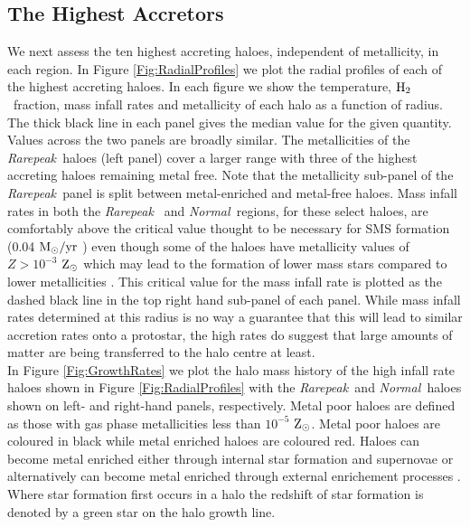\documentclass[graphics, twocolumn, usenatbib]{mn2e}
\newcommand{\msolaryr} {$\rm{M_{\odot}/yr}~$}
\newcommand{\zsolar} {$\rm{Z_{\odot}}~$}
\newcommand{\zsolarc} {$\rm{Z_{\odot}}$}
\newcommand{\molH} {$\rm{H_2}$~}
\newcommand{\rarepeak} {\textit{Rarepeak~}}
\newcommand{\normal} {\textit{Normal~}}
\begin{document}
\subsection{The Highest Accretors}
\indent We next assess the ten highest accreting haloes, independent of metallicity, in each region. In Figure
\ref{Fig:RadialProfiles} we plot the radial profiles of each of the highest accreting haloes.
In each figure we show the temperature, \molH fraction, mass infall rates and
metallicity of each halo as a function of radius. The thick black line in each panel gives the
median value for the given quantity. Values across the two panels are broadly similar. The
metallicities of the \rarepeak haloes (left panel) cover a larger range with three of the highest
accreting haloes remaining metal free. Note that the metallicity sub-panel of the \rarepeak panel
is split between metal-enriched and metal-free haloes. Mass infall rates in both the \rarepeak
and \normal regions, for these select haloes, are comfortably above the critical value thought to
be necessary for SMS formation (0.04
\msolaryr \citep{Sakurai_2016}) even though some of the haloes have metallicity values of $Z > 10^{-3}$
\zsolar which may lead to the formation of lower mass stars compared to lower metallicities
\citep{Chon_2020}. This critical value for the mass infall rate is plotted as the dashed black line in
the top right hand sub-panel of each panel. While mass infall rates determined at this radius is no
way a guarantee that this will lead to similar accretion rates onto a protostar, the high rates do
suggest that large amounts of matter are being transferred to the halo centre at least. \\
\indent In Figure \ref{Fig:GrowthRates} we plot the halo mass history of the high infall
rate haloes shown in Figure \ref{Fig:RadialProfiles} with the \rarepeak and \normal haloes
shown on left- and right-hand panels, respectively. 
Metal poor haloes are defined as those with gas phase metallicities less than
$10^{-5}$ \zsolarc. Metal poor haloes are coloured in black while metal enriched haloes are coloured
red. Haloes can become metal enriched either through internal star formation and supernovae or
alternatively can become metal enriched through external enrichement processes
\citep[e.g.][]{Smith_2015}. Where star formation first
occurs in a halo the redshift of star formation is denoted by a green star on the halo growth line. 
\end{document}
